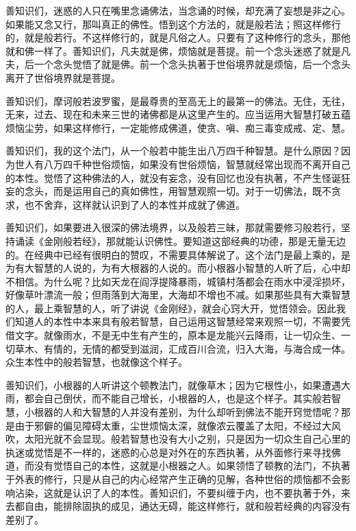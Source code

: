 \documentclass[12pt,twoside,openany]{book}
\newcommand{\kai}[1]{{\CJKfamily{kai}#1}}
\begin{document}
\kai{善知识们，迷惑的人只在嘴里念诵佛法，当念诵的时候，却充满了妄想是非之心。如果能又念又行，那叫真正的佛性。悟到这个方法的，就是般若法；照这样修行的，就是般若行。不这样修行的，就是凡俗之人。只要有了这种修行的念头，那他就和佛一样了。善知识们，凡夫就是佛，烦恼就是菩提。前一个念头迷惑了就是凡夫，后一个念头觉悟了就是佛。前一个念头执著于世俗境界就是烦恼，后一个念头离开了世俗境界就是菩提。
	
善知识们，摩诃般若波罗蜜，是最尊贵的至高无上的最第一的佛法。无住，无往，无来，过去、现在和未来三世的诸佛都是从这里产生的。应当运用大智慧打破五蕴烦恼尘劳，如果这样修行，一定能修成佛道，使贪、嗔、痴三毒变成戒、定、慧。

善知识们，我的这个法门，从一个般若中能生出八万四千种智慧。是什么原因？因为世人有八万四千种世俗烦恼，如果没有世俗烦恼，智慧就经常出现而不离开自己的本性。觉悟了这种佛法的人，就没有妄念，没有回忆也没有执著，不产生怪诞狂妄的念头，而是运用自己的真如佛性，用智慧观照一切。对于一切佛法，既不贪求，也不舍弃，这样就认识到了人的本性并成就了佛道。

善知识们，如果要进入很深的佛法境界，以及般若三昧，那就需要修习般若行，坚持诵读《金刚般若经》，那就能认识佛性。要知道这部经典的功德，那是无量无边的。在经典中已经有很明白的赞叹，不需要具体解说了。这个法门是最上乘的，是为有大智慧的人说的，为有大根器的人说的。而小根器小智慧的人听了后，心中却不相信。为什么呢？比如天龙在阎浮提降暴雨，城镇村落都会在雨水中浸淫损坏，好像草叶漂流一般；但雨落到大海里，大海却不增也不减。如果那些具有大乘智慧的人，最上乘智慧的人，听了讲说《金刚经》，就会心窍大开，觉悟领会。因此我们知道人的本性中本来具有般若智慧，自己运用这智慧经常来观照一切，不需要凭借文字。就像雨水，不是无中生有产生的，原本是龙能兴云降雨，让一切众生、一切草木、有情的，无情的都受到滋润，汇成百川合流，归入大海，与海合成一体。众生本性中的般若智慧，也就像这个样子。

善知识们，小根器的人听讲这个顿教法门，就像草木；因为它根性小，如果遭遇大雨，都会自己倒伏，而不能自己增长，小根器的人，也是这个样子。其实般若智慧，小根器的人和大智慧的人并没有差别，为什么却听到佛法不能开窍觉悟呢？那是由于邪僻的偏见障碍太重，尘世烦恼太深，就像浓云覆盖了太阳，不经过大风吹，太阳光就不会显现。般若智慧也没有大小之别，只是因为一切众生自己心里的执迷或觉悟是不一样的，迷惑的心总是对外在的东西执著，从外面修行来寻找佛道，而没有觉悟自己的本性，这就是小根器之人。如果领悟了顿教的法门，不执著于外表的修行，只是从自己的内心经常产生正确的见解，各种世俗的烦恼都不会影响沾染，这就是认识了人的本性。善知识们，不要纠缠于内，也不要执著于外，来去都自由，能排除固执的成见，通达无碍，能这样修行，就和般若经典的内容没有差别了。

}
\end{document}
